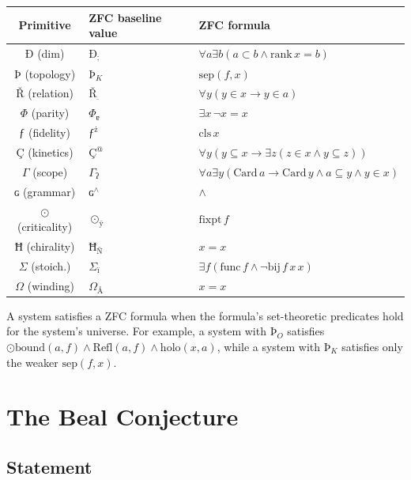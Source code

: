 \documentclass[12pt]{article}
\begin{document}
\begin{center}
\begin{tabular}{c|l|l}
Primitive & ZFC baseline value & ZFC formula \\
\hline
$\text{Ð}$ (dim)       & $\text{Ð}_;$   & $\forall a\exists b(a\subset b \land \text{rank}\,x=b)$ \\
$\text{Þ}$ (topology)  & $\text{Þ}_K$   & $\text{sep}(f,x)$ \\
$\text{Ř}$ (relation)  & $\text{Ř}_{\bar{}}$ & $\forall y(y\in x \to y\in a)$ \\
$\Phi$ (parity)        & $\Phi_{\text{ɐ}}$ & $\exists x\,\lnot x=x$ \\
$\text{ƒ}$ (fidelity)  & $\text{ƒ}^{\text{ż}}$ & $\text{cls}\,x$ \\
$\text{Ç}$ (kinetics)  & $\text{Ç}^@$  & $\forall y(y\subseteq x \to \exists z(z\in x \land y\subseteq z))$ \\
$\Gamma$ (scope)       & $\Gamma_{\text{ʔ}}$ & $\forall a\exists y(\text{Card}\,a \to \text{Card}\,y \land a\subseteq y \land y\in x)$ \\
$\text{ɢ}$ (grammar)   & $\text{ɢ}^{\land}$ & $\land$ \\
$\odot$ (criticality)  & $\odot_{\text{ÿ}}$ & $\text{fixpt}\,f$ \\
$\text{Ħ}$ (chirality) & $\text{Ħ}_\text{Ñ}$ & $x=x$ \\
$\Sigma$ (stoich.)     & $\Sigma_{\text{ï}}$ & $\exists f(\text{func}\,f \land \lnot\text{bij}\,f\,x\,x)$ \\
$\Omega$ (winding)     & $\Omega_{\text{Å}}$ & $x=x$ \\
\end{tabular}
\end{center}

A system satisfies a ZFC formula when the formula's set-theoretic
predicates hold for the system's universe. For example, a system
with $\text{Þ}_O$ satisfies $\odot\text{bound}(a,f) \land
\text{Refl}(a,f) \land \text{holo}(x,a)$, while a system with
$\text{Þ}_K$ satisfies only the weaker $\text{sep}(f,x)$.

\section{The Beal Conjecture}

\subsection{Statement}
\end{document}

